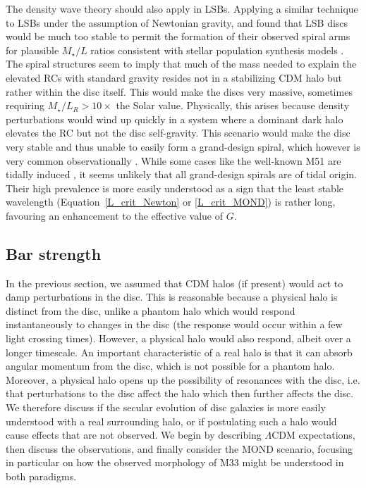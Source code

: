 \documentclass[fleqn,usenatbib,useAMS,onecolumn]{mnras} %
\begin{document}
The density wave theory should also apply in LSBs. Applying a similar technique to LSBs under the assumption of Newtonian gravity, \citet{Fuchs_2003} and \citet{Saburova_2013} found that LSB discs would be much too stable to permit the formation of their observed spiral arms for plausible $M_{\star}/L$ ratios consistent with stellar population synthesis models \citep[e.g.][]{Bell_2001}. The spiral structures seem to imply that much of the mass needed to explain the elevated RCs with standard gravity resides not in a stabilizing CDM halo but rather within the disc itself. This would make the discs very massive, sometimes requiring ${M_{\star}/L_R>10\times}$ the Solar value. Physically, this arises because density perturbations would wind up quickly in a system where a dominant dark halo elevates the RC but not the disc self-gravity. This scenario would make the disc very stable and thus unable to easily form a grand-design spiral, which however is very common observationally \citep{Hart_2017}. While some cases like the well-known M51 are tidally induced \citep{Dobbs_2010}, it seems unlikely that all grand-design spirals are of tidal origin. Their high prevalence is more easily understood as a sign that the least stable wavelength (Equation~\ref{L_crit_Newton} or \ref{L_crit_MOND}) is rather long, favouring an enhancement to the effective value of $G$.



\subsection{Bar strength}
\label{Bar_strength}

In the previous section, we assumed that CDM halos (if present) would act to damp perturbations in the disc. This is reasonable because a physical halo is distinct from the disc, unlike a phantom halo which would respond instantaneously to changes in the disc (the response would occur within a few light crossing times). However, a physical halo would also respond, albeit over a longer timescale. An important characteristic of a real halo is that it can absorb angular momentum from the disc, which is not possible for a phantom halo. Moreover, a physical halo opens up the possibility of resonances with the disc, i.e. that perturbations to the disc affect the halo which then further affects the disc. We therefore discuss if the secular evolution of disc galaxies is more easily understood with a real surrounding halo, or if postulating such a halo would cause effects that are not observed. We begin by describing $\Lambda$CDM expectations, then discuss the observations, and finally consider the MOND scenario, focusing in particular on how the observed morphology of M33 might be understood in both paradigms.
\end{document}
